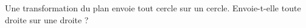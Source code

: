 Une transformation du plan envoie tout cercle sur un cercle. Envoie-t-elle toute droite sur une droite ?
